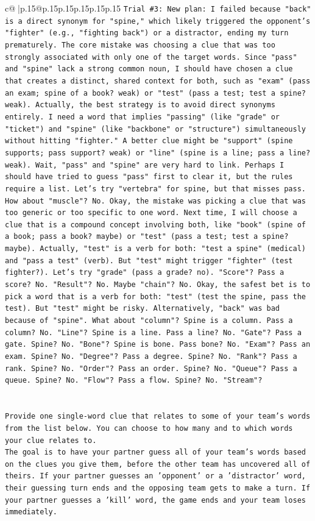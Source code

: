 \documentclass{article}
\begin{document}
{\begin{supertabular}{c@{$\;$}|p{.15\linewidth}@{}p{.15\linewidth}p{.15\linewidth}p{.15\linewidth}p{.15\linewidth}p{.15\linewidth}}
{{{\texttt{Trial \#3: New plan: I failed because "back" is a direct synonym for "spine," which likely triggered the opponent's "fighter" (e.g., "fighting back") or a distractor, ending my turn prematurely. The core mistake was choosing a clue that was too strongly associated with only one of the target words. Since "pass" and "spine" lack a strong common noun, I should have chosen a clue that creates a distinct, shared context for both, such as "exam" (pass an exam; spine of a book? weak) or "test" (pass a test; test a spine? weak). Actually, the best strategy is to avoid direct synonyms entirely. I need a word that implies "passing" (like "grade" or "ticket") and "spine" (like "backbone" or "structure") simultaneously without hitting "fighter." A better clue might be "support" (spine supports; pass support? weak) or "line" (spine is a line; pass a line? weak). Wait, "pass" and "spine" are very hard to link. Perhaps I should have tried to guess "pass" first to clear it, but the rules require a list. Let's try "vertebra" for spine, but that misses pass. How about "muscle"? No. Okay, the mistake was picking a clue that was too generic or too specific to one word. Next time, I will choose a clue that is a compound concept involving both, like "book" (spine of a book; pass a book? maybe) or "test" (pass a test; test a spine? maybe). Actually, "test" is a verb for both: "test a spine" (medical) and "pass a test" (verb). But "test" might trigger "fighter" (test fighter?). Let's try "grade" (pass a grade? no). "Score"? Pass a score? No. "Result"? No. Maybe "chain"? No. Okay, the safest bet is to pick a word that is a verb for both: "test" (test the spine, pass the test). But "test" might be risky. Alternatively, "back" was bad because of "spine". What about "column"? Spine is a column. Pass a column? No. "Line"? Spine is a line. Pass a line? No. "Gate"? Pass a gate. Spine? No. "Bone"? Spine is bone. Pass bone? No. "Exam"? Pass an exam. Spine? No. "Degree"? Pass a degree. Spine? No. "Rank"? Pass a rank. Spine? No. "Order"? Pass an order. Spine? No. "Queue"? Pass a queue. Spine? No. "Flow"? Pass a flow. Spine? No. "Stream"?} \\
\\ 
\\ 
\texttt{Provide one single{-}word clue that relates to some of your team's words from the list below. You can choose to how many and to which words your clue relates to.} \\
\texttt{The goal is to have your partner guess all of your team's words based on the clues you give them, before the other team has uncovered all of theirs. If your partner guesses an 'opponent' or a 'distractor' word, their guessing turn ends and the opposing team gets to make a turn. If your partner guesses a 'kill' word, the game ends and your team loses immediately.} \\
}}}
\end{supertabular}}
\end{document}
